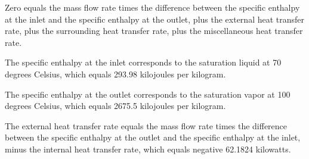 Zero equals the mass flow rate times the difference between the specific enthalpy at the inlet and the specific enthalpy at the outlet, plus the external heat transfer rate, plus the surrounding heat transfer rate, plus the miscellaneous heat transfer rate.

The specific enthalpy at the inlet corresponds to the saturation liquid at 70 degrees Celsius, which equals 293.98 kilojoules per kilogram.

The specific enthalpy at the outlet corresponds to the saturation vapor at 100 degrees Celsius, which equals 2675.5 kilojoules per kilogram.

The external heat transfer rate equals the mass flow rate times the difference between the specific enthalpy at the outlet and the specific enthalpy at the inlet, minus the internal heat transfer rate, which equals negative 62.1824 kilowatts.
